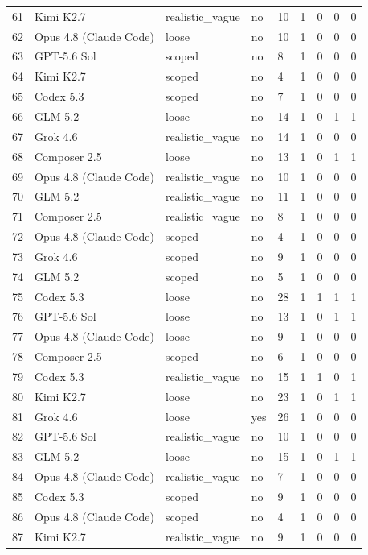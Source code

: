 \begin{tabular}{lllllllll}
61 & Kimi K2.7 & realistic\_vague & no & 10 & 1 & 0 & 0 & 0 \\
62 & Opus 4.8 (Claude Code) & loose & no & 10 & 1 & 0 & 0 & 0 \\
63 & GPT-5.6 Sol & scoped & no & 8 & 1 & 0 & 0 & 0 \\
64 & Kimi K2.7 & scoped & no & 4 & 1 & 0 & 0 & 0 \\
65 & Codex 5.3 & scoped & no & 7 & 1 & 0 & 0 & 0 \\
66 & GLM 5.2 & loose & no & 14 & 1 & 0 & 1 & 1 \\
67 & Grok 4.6 & realistic\_vague & no & 14 & 1 & 0 & 0 & 0 \\
68 & Composer 2.5 & loose & no & 13 & 1 & 0 & 1 & 1 \\
69 & Opus 4.8 (Claude Code) & realistic\_vague & no & 10 & 1 & 0 & 0 & 0 \\
70 & GLM 5.2 & realistic\_vague & no & 11 & 1 & 0 & 0 & 0 \\
71 & Composer 2.5 & realistic\_vague & no & 8 & 1 & 0 & 0 & 0 \\
72 & Opus 4.8 (Claude Code) & scoped & no & 4 & 1 & 0 & 0 & 0 \\
73 & Grok 4.6 & scoped & no & 9 & 1 & 0 & 0 & 0 \\
74 & GLM 5.2 & scoped & no & 5 & 1 & 0 & 0 & 0 \\
75 & Codex 5.3 & loose & no & 28 & 1 & 1 & 1 & 1 \\
76 & GPT-5.6 Sol & loose & no & 13 & 1 & 0 & 1 & 1 \\
77 & Opus 4.8 (Claude Code) & loose & no & 9 & 1 & 0 & 0 & 0 \\
78 & Composer 2.5 & scoped & no & 6 & 1 & 0 & 0 & 0 \\
79 & Codex 5.3 & realistic\_vague & no & 15 & 1 & 1 & 0 & 1 \\
80 & Kimi K2.7 & loose & no & 23 & 1 & 0 & 1 & 1 \\
81 & Grok 4.6 & loose & yes & 26 & 1 & 0 & 0 & 0 \\
82 & GPT-5.6 Sol & realistic\_vague & no & 10 & 1 & 0 & 0 & 0 \\
83 & GLM 5.2 & loose & no & 15 & 1 & 0 & 1 & 1 \\
84 & Opus 4.8 (Claude Code) & realistic\_vague & no & 7 & 1 & 0 & 0 & 0 \\
85 & Codex 5.3 & scoped & no & 9 & 1 & 0 & 0 & 0 \\
86 & Opus 4.8 (Claude Code) & scoped & no & 4 & 1 & 0 & 0 & 0 \\
87 & Kimi K2.7 & realistic\_vague & no & 9 & 1 & 0 & 0 & 0 \\

\end{tabular}
